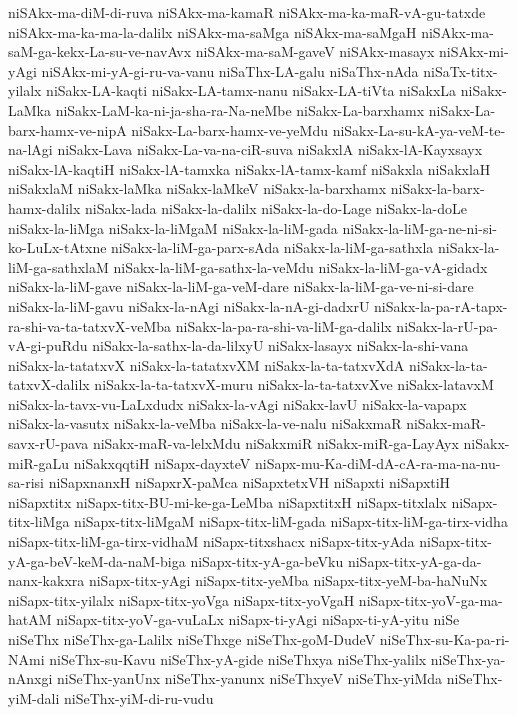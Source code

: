 {niSAkx-ma-diM-di-ruva
niSAkx-ma-kamaR
niSAkx-ma-ka-maR-vA-gu-tatxde
niSAkx-ma-ka-ma-la-dalilx
niSAkx-ma-saMga
niSAkx-ma-saMgaH
niSAkx-ma-saM-ga-kekx-La-su-ve-navAvx
niSAkx-ma-saM-gaveV
niSAkx-masayx
niSAkx-mi-yAgi
niSAkx-mi-yA-gi-ru-va-vanu
niSaThx-LA-galu
niSaThx-nAda
niSaTx-titx-yilalx
niSakx-LA-kaqti
niSakx-LA-tamx-nanu
niSakx-LA-tiVta
niSakxLa
niSakx-LaMka
niSakx-LaM-ka-ni-ja-sha-ra-Na-neMbe
niSakx-La-barxhamx
niSakx-La-barx-hamx-ve-nipA
niSakx-La-barx-hamx-ve-yeMdu
niSakx-La-su-kA-ya-veM-te-na-lAgi
niSakx-Lava
niSakx-La-va-na-ciR-suva
niSakxlA
niSakx-lA-Kayxsayx
niSakx-lA-kaqtiH
niSakx-lA-tamxka
niSakx-lA-tamx-kamf
niSakxla
niSakxlaH
niSakxlaM
niSakx-laMka
niSakx-laMkeV
niSakx-la-barxhamx
niSakx-la-barx-hamx-dalilx
niSakx-lada
niSakx-la-dalilx
niSakx-la-do-Lage
niSakx-la-doLe
niSakx-la-liMga
niSakx-la-liMgaM
niSakx-la-liM-gada
niSakx-la-liM-ga-ne-ni-si-ko-LuLx-tAtxne
niSakx-la-liM-ga-parx-sAda
niSakx-la-liM-ga-sathxla
niSakx-la-liM-ga-sathxlaM
niSakx-la-liM-ga-sathx-la-veMdu
niSakx-la-liM-ga-vA-gidadx
niSakx-la-liM-gave
niSakx-la-liM-ga-veM-dare
niSakx-la-liM-ga-ve-ni-si-dare
niSakx-la-liM-gavu
niSakx-la-nAgi
niSakx-la-nA-gi-dadxrU
niSakx-la-pa-rA-tapx-ra-shi-va-ta-tatxvX-veMba
niSakx-la-pa-ra-shi-va-liM-ga-dalilx
niSakx-la-rU-pa-vA-gi-puRdu
niSakx-la-sathx-la-da-lilxyU
niSakx-lasayx
niSakx-la-shi-vana
niSakx-la-tatatxvX
niSakx-la-tatatxvXM
niSakx-la-ta-tatxvXdA
niSakx-la-ta-tatxvX-dalilx
niSakx-la-ta-tatxvX-muru
niSakx-la-ta-tatxvXve
niSakx-latavxM
niSakx-la-tavx-vu-LaLxdudx
niSakx-la-vAgi
niSakx-lavU
niSakx-la-vapapx
niSakx-la-vasutx
niSakx-la-veMba
niSakx-la-ve-nalu
niSakxmaR
niSakx-maR-savx-rU-pava
niSakx-maR-va-lelxMdu
niSakxmiR
niSakx-miR-ga-LayAyx
niSakx-miR-gaLu
niSakxqqtiH
niSapx-dayxteV
niSapx-mu-Ka-diM-dA-cA-ra-ma-na-nu-sa-risi
niSapxnanxH
niSapxrX-paMca
niSapxtetxVH
niSapxti
niSapxtiH
niSapxtitx
niSapx-titx-BU-mi-ke-ga-LeMba
niSapxtitxH
niSapx-titxlalx
niSapx-titx-liMga
niSapx-titx-liMgaM
niSapx-titx-liM-gada
niSapx-titx-liM-ga-tirx-vidha
niSapx-titx-liM-ga-tirx-vidhaM
niSapx-titxshacx
niSapx-titx-yAda
niSapx-titx-yA-ga-beV-keM-da-naM-biga
niSapx-titx-yA-ga-beVku
niSapx-titx-yA-ga-da-nanx-kakxra
niSapx-titx-yAgi
niSapx-titx-yeMba
niSapx-titx-yeM-ba-haNuNx
niSapx-titx-yilalx
niSapx-titx-yoVga
niSapx-titx-yoVgaH
niSapx-titx-yoV-ga-ma-hatAM
niSapx-titx-yoV-ga-vuLaLx
niSapx-ti-yAgi
niSapx-ti-yA-yitu
niSe
niSeThx
niSeThx-ga-Lalilx
niSeThxge
niSeThx-goM-DudeV
niSeThx-su-Ka-pa-ri-NAmi
niSeThx-su-Kavu
niSeThx-yA-gide
niSeThxya
niSeThx-yalilx
niSeThx-ya-nAnxgi
niSeThx-yanUnx
niSeThx-yanunx
niSeThxyeV
niSeThx-yiMda
niSeThx-yiM-dali
niSeThx-yiM-di-ru-vudu
}
